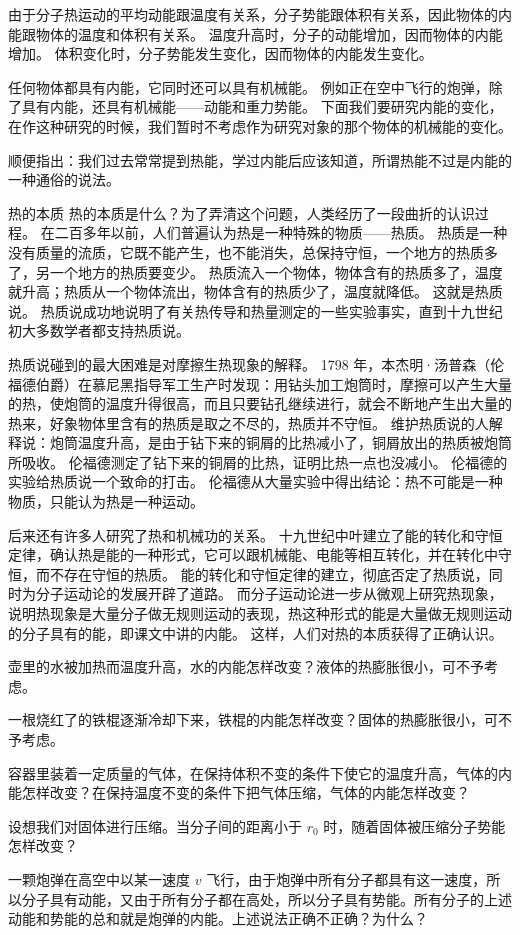 由于分子热运动的平均动能跟温度有关系，分子势能跟体积有关系，因此物体的内能跟物体的温度和体积有关系。
温度升高时，分子的动能增加，因而物体的内能增加。
体积变化时，分子势能发生变化，因而物体的内能发生变化。

任何物体都具有内能，它同时还可以具有机械能。
例如正在空中飞行的炮弹，除了具有内能，还具有机械能——动能和重力势能。
下面我们要研究内能的变化，在作这种研究的时候，我们暂时不考虑作为研究对象的那个物体的机械能的变化。

顺便指出：我们过去常常提到热能，学过内能后应该知道，所谓热能不过是内能的一种通俗的说法。

\begin{Reading}{热的本质}
热的本质是什么？为了弄清这个问题，人类经历了一段曲折的认识过程。
在二百多年以前，人们普遍认为热是一种特殊的物质——热质。
热质是一种没有质量的流质，它既不能产生，也不能消失，总保持守恒，一个地方的热质多了，另一个地方的热质要变少。
热质流入一个物体，物体含有的热质多了，温度就升高；热质从一个物体流出，物体含有的热质少了，温度就降低。
这就是热质说。
热质说成功地说明了有关热传导和热量测定的一些实验事实，直到十九世纪初大多数学者都支持热质说。

热质说碰到的最大困难是对摩擦生热现象的解释。
1798 年，本杰明·汤普森（伦福德伯爵）在慕尼黑指导军工生产时发现：用钻头加工炮筒时，摩擦可以产生大量的热，使炮筒的温度升得很高，而且只要钻孔继续进行，就会不断地产生出大量的热来，好象物体里含有的热质是取之不尽的，热质并不守恒。
维护热质说的人解释说：炮筒温度升高，是由于钻下来的铜屑的比热减小了，铜屑放出的热质被炮筒所吸收。
伦福德测定了钻下来的铜屑的比热，证明比热一点也没减小。
伦福德的实验给热质说一个致命的打击。
伦福德从大量实验中得出结论：热不可能是一种物质，只能认为热是一种运动。

后来还有许多人研究了热和机械功的关系。
十九世纪中叶建立了能的转化和守恒定律，确认热是能的一种形式，它可以跟机械能、电能等相互转化，并在转化中守恒，而不存在守恒的热质。
能的转化和守恒定律的建立，彻底否定了热质说，同时为分子运动论的发展开辟了道路。
而分子运动论进一步从微观上研究热现象，说明热现象是大量分子做无规则运动的表现，热这种形式的能是大量做无规则运动的分子具有的能，即课文中讲的内能。
这样，人们对热的本质获得了正确认识。
\end{Reading}

\begin{Practice}
\begin{question}
	\item 壶里的水被加热而温度升高，水的内能怎样改变？液体的热膨胀很小，可不予考虑。
	\item 一根烧红了的铁棍逐渐冷却下来，铁棍的内能怎样改变？固体的热膨胀很小，可不予考虑。
	\item 容器里装着一定质量的气体，在保持体积不变的条件下使它的温度升高，气体的内能怎样改变？在保持温度不变的条件下把气体压缩，气体的内能怎样改变？
	\item 设想我们对固体进行压缩。当分子间的距离小于 $r_0$ 时，随着固体被压缩分子势能怎样改变？
	\item 一颗炮弹在高空中以某一速度 $v$ 飞行，由于炮弹中所有分子都具有这一速度，所以分子具有动能，又由于所有分子都在高处，所以分子具有势能。所有分子的上述动能和势能的总和就是炮弹的内能。上述说法正确不正确？为什么？
\end{question}
\end{Practice}

